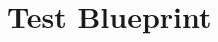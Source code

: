 \documentclass[runningheads]{llncs}
\newcommand{\fig}[4]{
	\begin{figure}[#1]
		\centering
		\texttt{[image: \#3]}
		\caption{\label{fig:#3}#4}
	\end{figure}}
\newcommand{\seclabel}[1]{\label{sec:#1}}
\newcommand{\figref}[1]{Figure~\ref{fig:#1}}
\newcommand{\tablabel}[1]{\label{tab:#1}}
\begin{document}




\section{Test Blueprint} \seclabel{testblueprint}

%
%
%
%
\end{document}
